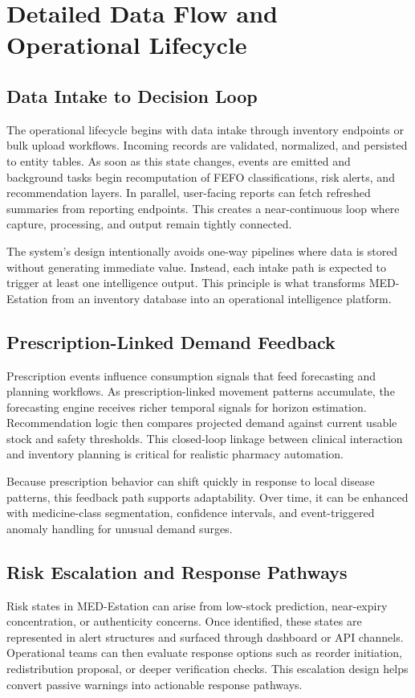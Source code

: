 \documentclass[12pt,a4paper]{article}
\begin{document}
\section{Detailed Data Flow and Operational Lifecycle}
\subsection{Data Intake to Decision Loop}
The operational lifecycle begins with data intake through inventory endpoints or bulk upload workflows. Incoming records are validated, normalized, and persisted to entity tables. As soon as this state changes, events are emitted and background tasks begin recomputation of FEFO classifications, risk alerts, and recommendation layers. In parallel, user-facing reports can fetch refreshed summaries from reporting endpoints. This creates a near-continuous loop where capture, processing, and output remain tightly connected.

The system’s design intentionally avoids one-way pipelines where data is stored without generating immediate value. Instead, each intake path is expected to trigger at least one intelligence output. This principle is what transforms MED-Estation from an inventory database into an operational intelligence platform.

\subsection{Prescription-Linked Demand Feedback}
Prescription events influence consumption signals that feed forecasting and planning workflows. As prescription-linked movement patterns accumulate, the forecasting engine receives richer temporal signals for horizon estimation. Recommendation logic then compares projected demand against current usable stock and safety thresholds. This closed-loop linkage between clinical interaction and inventory planning is critical for realistic pharmacy automation.

Because prescription behavior can shift quickly in response to local disease patterns, this feedback path supports adaptability. Over time, it can be enhanced with medicine-class segmentation, confidence intervals, and event-triggered anomaly handling for unusual demand surges.

\subsection{Risk Escalation and Response Pathways}
Risk states in MED-Estation can arise from low-stock prediction, near-expiry concentration, or authenticity concerns. Once identified, these states are represented in alert structures and surfaced through dashboard or API channels. Operational teams can then evaluate response options such as reorder initiation, redistribution proposal, or deeper verification checks. This escalation design helps convert passive warnings into actionable response pathways.
\end{document}
